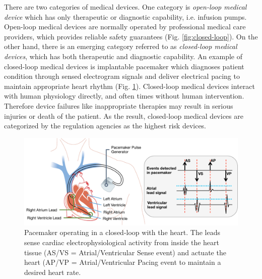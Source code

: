 \documentclass[a4paper]{article}
\begin{document}
There are two categories of medical devices. 
One category is \emph{open-loop medical device} which has only therapeutic or diagnostic capability, i.e. infusion pumps. 
Open-loop medical devices are normally operated by professional medical care providers, which provides reliable safety guarantees (Fig. \ref{fig:closed-loop}).
On the other hand, there is an emerging category referred to as \emph{closed-loop medical devices}, which has both therapeutic and diagnostic capability.
An example of closed-loop medical devices is implantable pacemaker which diagnoses patient condition through sensed electrogram signals and deliver electrical pacing to maintain appropriate heart rhythm (Fig. \ref{fig:pacemaker}). 
Closed-loop medical devices interact with human physiology directly, and often times without human intervention.
Therefore device failures like inappropriate therapies may result in serious injuries or death of the patient.
As the result, closed-loop medical devices are categorized by the regulation agencies as the highest risk devices.
\begin{figure}[b]
	\centering
	\includegraphics[scale=0.35]{figs/fig1pacemaker.pdf}
	\caption{\small Pacemaker operating in a closed-loop with the heart. The leads sense cardiac electrophysiological activity from inside the heart tissue (AS/VS = Atrial/Ventricular Sense event) and actuate the heart (AP/VP = Atrial/Ventricular Pacing event to maintain a desired heart rate.}
	\label{fig:pacemaker}
\end{figure}
\end{document}
